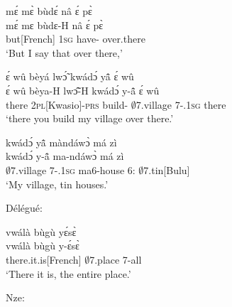 \begin{exe}[(C234)]  
\exC\label{215} 
  \glll  mɛ́ mɛ̀ bùdɛ́ nâ ɛ́ pɛ̀  \\
       mɛ́ mɛ bùdɛ-H nâ ɛ́ pɛ̀ \\
         but[French] 1\textsc{sg} have-{\R} {\COMP} {\LOC} over.there \\
    \trans `But I say that over there,'
 
\exC\label{216}
  \glll ɛ́ wû bèyá lwɔ̃́ kwádɔ́ yã̂ ɛ́ wû \\
        ɛ́ wû bèya-H lwɔ̃̂-H kwádɔ́ y-ã̂ ɛ́ wû \\
         {\LOC} there 2\textsc{pl}[Kwasio]-\textsc{prs} build-{\R} $\emptyset$7.village 7-{\POSS}.1\textsc{sg} {\LOC} there\\
    \trans `there you build my village over there.'
 
\exC\label{217} 
  \glll   kwádɔ́ yã̂ màndáwɔ̀ má zì \\
      kwádɔ́ y-ã̂ ma-ndáwɔ̀ má zì \\
         $\emptyset$7.village 7-{\POSS}.1\textsc{sg} ma6-house 6:{\ATT}  $\emptyset$7.tin[Bulu] \\
    \trans `My village, tin houses.'
\end{exe}

\noindent Délégué:

\begin{exe}[(C234)]  
\exC\label{218} 
  \glll  vwálà bùgù yɛ́sɛ̀ \\
        vwálà bùgù y-ɛ́sɛ̀ \\
        there.it.is[French] $\emptyset$7.place 7-all  \\
    \trans `There it is, the entire place.'
\end{exe}

\noindent Nze:

